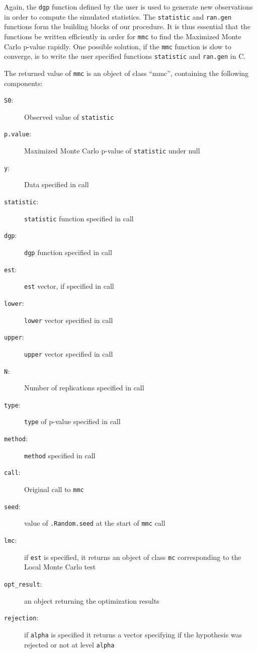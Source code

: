 \documentclass[]{article}\usepackage[]{graphicx}\usepackage[]{color}
\let\proglang=\textsf
\let\code=\texttt
\begin{document}
	Again, the \code{dgp} function defined by the user is used to generate new observations in order to compute the simulated statistics. The \code{statistic} and \code{ran.gen} functions form the building blocks of our procedure. It is thus essential that the functions be written efficiently in order for \code{mmc} to find the Maximized Monte Carlo p-value rapidly. One possible solution, if the \code{mmc} function is slow to converge, is to write the user specified functions \code{statistic} and \code{ran.gen} in \proglang{C}.

	The returned value of \code{mmc} is an object of class ``mmc'', containing the following components:
	\begin{description}
		\item[\code{S0}:] Observed value of \code{statistic}
		\item[\code{p.value}:] Maximized Monte Carlo p-value of \code{statistic} under null
		\item[\code{y}:] Data specified in call
		\item[\code{statistic}:] \code{statistic} function specified in call
		\item[\code{dgp}:] \code{dgp} function specified in call
		\item[\code{est}:] \code{est} vector, if specified in call
		\item[\code{lower}:] \code{lower} vector specified in call
		\item[\code{upper}:] \code{upper} vector specified in call
		\item[\code{N}:] Number of replications specified in call
		\item[\code{type}:] \code{type} of p-value specified in call
		\item[\code{method}:] \code{method} specified in call
		\item[\code{call}:] Original call to \code{mmc}
		\item[\code{seed}:] value of \code{.Random.seed} at the start of \code{mmc} call
		\item[\code{lmc}:] if \code{est} is specified, it returns an object of class \code{mc}
		corresponding to the Local Monte Carlo test
		\item[\code{opt\_result}:] an object returning the optimization results
		\item[\code{rejection}:] if \code{alpha} is specified it returns a vector specifying if the
		hypothesis was rejected or not at level \code{alpha}
	\end{description}
\end{document}
